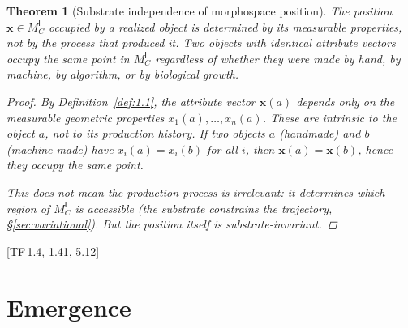 \documentclass[11pt, a4paper]{article}
\theoremstyle{definition}
\theoremstyle{plain}
\newtheorem{theorem}[definition]{Theorem}
\theoremstyle{remark}
\newcommand{\MC}{M^{\mathsf{I}}_C}          %
\newcommand{\TF}[1]{\textnormal{[TF\,#1]}}  %
\begin{document}
\begin{theorem}[Substrate independence of morphospace position]%
\label{thm:7.2}
The position $\bm{x} \in \MC$ occupied by a realized object is
determined by its measurable properties, not by the process that
produced it. Two objects with identical attribute vectors occupy the
same point in $\MC$ regardless of whether they were made by hand, by
machine, by algorithm, or by biological growth.

\begin{proof}
By Definition~\ref{def:1.1}, the attribute vector $\bm{x}(a)$ depends
only on the measurable geometric properties $x_1(a), \ldots, x_n(a)$.
These are intrinsic to the object $a$, not to its production history.
If two objects $a$ (handmade) and $b$ (machine-made) have
$x_i(a) = x_i(b)$ for all $i$, then $\bm{x}(a) = \bm{x}(b)$,
hence they occupy the same point.

This does \emph{not} mean the production process is irrelevant: it
determines which region of $\MC$ is accessible (the substrate constrains
the trajectory, \S\ref{sec:variational}). But the position itself is
substrate-invariant. \qedhere
\end{proof}
\end{theorem}

\TF{1.4, 1.41, 5.12}

\newpage
\section{Emergence}\label{sec:emergence}
\end{document}
